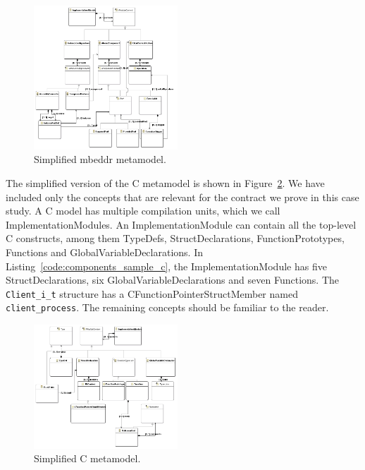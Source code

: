 \begin{figure}
\begin{center}
  \includegraphics[width=0.48\textwidth]{figures/Moduleclassdiagram}
  \caption{Simplified mbeddr metamodel. }
  \label{fig:Moduleclassdiagram}
\end{center}
\end{figure}

The simplified version of the C metamodel is shown in
Figure~\ref{fig:CModelclassdiagram}.
We have included only the concepts that are relevant for the contract we prove
in this case study.
A C model has multiple compilation units, which we call
ImplementationModules.
An ImplementationModule can contain all the top-level C constructs, among them
TypeDefs, StructDeclarations, FunctionPrototypes, Functions and
GlobalVariableDeclarations.
In Listing~\ref{code:components_sample_c}, the ImplementationModule has five
StructDeclarations, six GlobalVariableDeclarations and seven Functions.
The \verb=Client_i_t= structure has a CFunctionPointerStructMember named
\verb=client_process=. The remaining concepts should be familiar to the
reader.

\begin{figure}
\begin{center}
  \includegraphics[width=0.48\textwidth]{figures/CModelclassdiagram}
  \caption{Simplified C metamodel. }
  \label{fig:CModelclassdiagram}
\end{center}
\end{figure}


